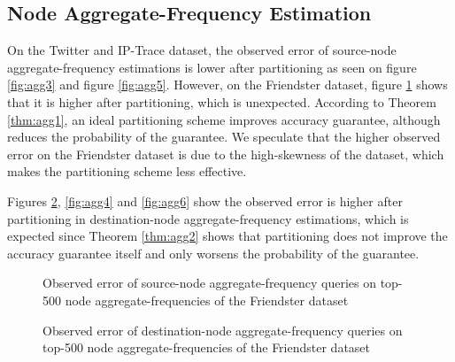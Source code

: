 \clearpage
\subsection{Node Aggregate-Frequency Estimation}

On the Twitter and IP-Trace dataset, the observed error of source-node aggregate-frequency estimations is lower after partitioning as seen on figure \ref{fig:agg3} and figure \ref{fig:agg5}. However, on the Friendster dataset, figure \ref{fig:agg1} shows that it is higher after partitioning, which is unexpected. According to Theorem \ref{thm:agg1}, an ideal partitioning scheme improves accuracy guarantee, although reduces the probability of the guarantee. We speculate that the higher observed error on the Friendster dataset is due to the high-skewness of the dataset, which makes the partitioning scheme less effective.

Figures \ref{fig:agg2}, \ref{fig:agg4} and \ref{fig:agg6} show the observed error is higher after partitioning in destination-node aggregate-frequency estimations, which is expected since Theorem \ref{thm:agg2} shows that partitioning does not improve the accuracy guarantee itself and only worsens the probability of the guarantee.

\begin{figure}[!htbp]
\centering
{}
\caption{Observed error of source-node aggregate-frequency queries on top-500 node aggregate-frequencies of the Friendster dataset} \label{fig:agg1}
\end{figure}

\begin{figure}[!htbp]
\centering
{}
\caption{Observed error of destination-node aggregate-frequency queries on top-500 node aggregate-frequencies of the Friendster dataset} \label{fig:agg2}
\end{figure}

